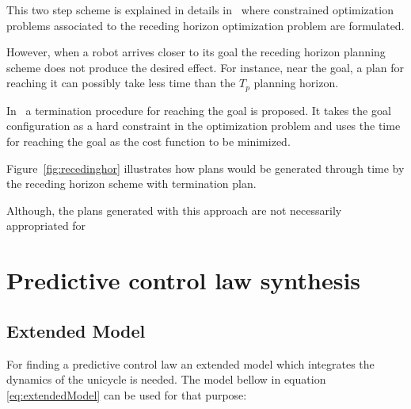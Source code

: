 \documentclass[letterpaper, 10 pt, conference]{ieeeconf}  %
\begin{document}
This two step scheme is explained in details in~\cite{Defoort2009} where constrained optimization problems associated to the receding horizon 
optimization problem are formulated.

However, when a robot arrives closer to its goal the receding horizon planning scheme does not produce the desired effect. For instance, near the goal, a plan for reaching it can possibly take less time than the $T_p$ planning horizon. 

In~\cite{MendesFilho2015} a termination procedure for reaching the goal is proposed. It takes the goal configuration as a hard constraint in the optimization problem and uses the time for reaching the goal as the cost function to be minimized.

Figure~\ref{fig:recedinghor} illustrates how plans would be generated through time by the receding horizon scheme with termination plan.


Although, the plans generated with this approach are not necessarily appropriated for 



\mbox{}



\section{Predictive control law synthesis}

\subsection{Extended Model}

For finding a predictive control law an extended model which integrates the dynamics of the unicycle is needed. The model bellow in equation \ref{eq:extendedModel} can be used for that purpose:
\end{document}
